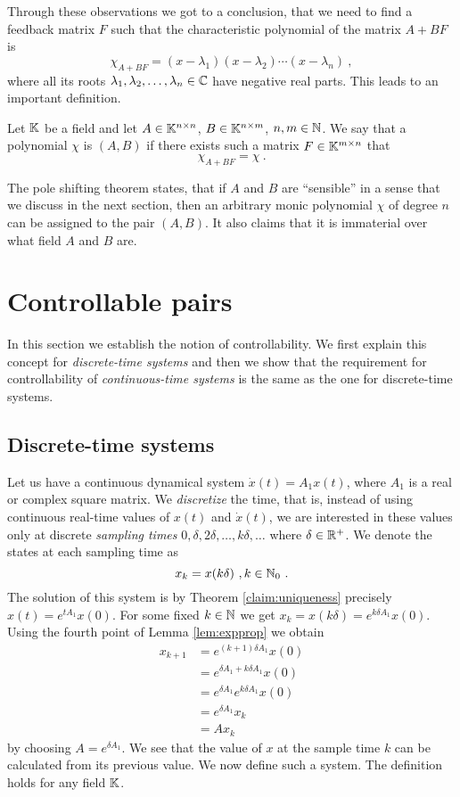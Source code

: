 Through these observations we got to a conclusion, that we need to find a feedback matrix $F$ such that the characteristic polynomial of the matrix $A+BF$ is $$\chi_{A+BF}=(x-\lambda_1)(x-\lambda_2)\cdots(x-\lambda_n)\ ,$$ where all its roots $\lambda_1,\lambda_2,\ldots,\lambda_n \in \mathbb{C}$ have negative real parts. This leads to an important definition.

\begin{definition}
    Let $\mathbb{K}$ be a field and let $A \in \mathbb{K}^{n \times n}$, $B \in \mathbb{K}^{n \times m}$, $n,m \in \mathbb{N}$. We say that a polynomial $\chi$ is  $(A,B)$ if there exists such a matrix $F\in\mathbb{K}^{m \times n}$ that $$\chi_{A+BF}=\chi\ .$$
\end{definition}

The pole shifting theorem states, that if $A$ and $B$ are ``sensible'' in a sense that we discuss in the next section, then an arbitrary monic polynomial $\chi$ of degree $n$ can be assigned to the pair $(A,B)$. It also claims that it is immaterial over what field $A$ and $B$ are.

\section{Controllable pairs}

In this section we establish the notion of controllability. We first explain this concept for \textit{discrete-time systems} and then we show that the requirement for controllability of \textit{continuous-time systems} is the same as the one for discrete-time systems.

\subsection{Discrete-time systems}

Let us have a continuous dynamical system $\dot{x}(t)=A_1x(t)$, where $A_1$ is a real or complex square matrix. We \textit{discretize} the time, that is, instead of using continuous real-time values of $x(t)$ and $\dot{x}(t)$, we are interested in these values only at discrete \textit{sampling times} $0,\delta,2\delta,\ldots,k\delta,\ldots$ where $\delta\in\mathbb{R}^+$. We denote the states at each sampling time as
$$x_k=x(k\delta)\ ,k\in\mathbb{N}_0\ .$$
The solution of this system is by Theorem \ref{claim:uniqueness} precisely $x(t)=e^{tA_1}x(0)$. For some fixed $k\in\mathbb{N}$ we get $x_k=x(k\delta)=e^{k\delta A_1}x(0)$. Using the fourth point of Lemma \ref{lem:expprop} we obtain 
\begin{align*}
	x_{k+1}
	&=e^{(k+1)\delta A_1}x(0) \\
	&=e^{\delta A_1 +k\delta A_1}x(0) \\
	&=e^{\delta A_1}e^{k\delta A_1}x(0) \\
	&=e^{\delta A_1}x_k \\
	&=Ax_k
\end{align*}
by choosing $A=e^{\delta A_1}$. We see that the value of $x$ at the sample time $k$ can be calculated from its previous value. We now define such a system. The definition holds for any field $\mathbb{K}$.

